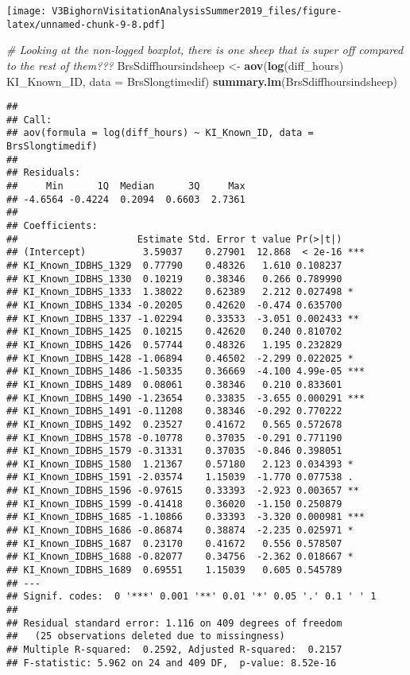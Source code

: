 \documentclass[]{article}
\newenvironment{Shaded}{\begin{snugshade}}{\end{snugshade}}
\newcommand{\CommentTok}[1]{\textcolor[rgb]{0.56,0.35,0.01}{\textit{#1}}}
\newcommand{\DataTypeTok}[1]{\textcolor[rgb]{0.13,0.29,0.53}{#1}}
\newcommand{\KeywordTok}[1]{\textcolor[rgb]{0.13,0.29,0.53}{\textbf{#1}}}
\newcommand{\NormalTok}[1]{#1}
\newcommand{\OperatorTok}[1]{\textcolor[rgb]{0.81,0.36,0.00}{\textbf{#1}}}
\newcommand{\StringTok}[1]{\textcolor[rgb]{0.31,0.60,0.02}{#1}}
\begin{document}
\texttt{[image: V3BighornVisitationAnalysisSummer2019\_files/figure-latex/unnamed-chunk-9-8.pdf]}

\begin{Shaded}
\begin{Highlighting}[]
\CommentTok{# Looking at the non-logged boxplot, there is one sheep that is super off compared to the rest of them???}
\NormalTok{BrsSdiffhoursindsheep <-}\StringTok{ }\KeywordTok{aov}\NormalTok{(}\KeywordTok{log}\NormalTok{(diff_hours) }\OperatorTok{~}\StringTok{ }\NormalTok{KI_Known_ID, }\DataTypeTok{data =}\NormalTok{ BrsSlongtimedif)}
\KeywordTok{summary.lm}\NormalTok{(BrsSdiffhoursindsheep)}
\end{Highlighting}
\end{Shaded}

\begin{verbatim}
## 
## Call:
## aov(formula = log(diff_hours) ~ KI_Known_ID, data = BrsSlongtimedif)
## 
## Residuals:
##     Min      1Q  Median      3Q     Max 
## -4.6564 -0.4224  0.2094  0.6603  2.7361 
## 
## Coefficients:
##                     Estimate Std. Error t value Pr(>|t|)    
## (Intercept)          3.59037    0.27901  12.868  < 2e-16 ***
## KI_Known_IDBHS_1329  0.77790    0.48326   1.610 0.108237    
## KI_Known_IDBHS_1330  0.10219    0.38346   0.266 0.789990    
## KI_Known_IDBHS_1333  1.38022    0.62389   2.212 0.027498 *  
## KI_Known_IDBHS_1334 -0.20205    0.42620  -0.474 0.635700    
## KI_Known_IDBHS_1337 -1.02294    0.33533  -3.051 0.002433 ** 
## KI_Known_IDBHS_1425  0.10215    0.42620   0.240 0.810702    
## KI_Known_IDBHS_1426  0.57744    0.48326   1.195 0.232829    
## KI_Known_IDBHS_1428 -1.06894    0.46502  -2.299 0.022025 *  
## KI_Known_IDBHS_1486 -1.50335    0.36669  -4.100 4.99e-05 ***
## KI_Known_IDBHS_1489  0.08061    0.38346   0.210 0.833601    
## KI_Known_IDBHS_1490 -1.23654    0.33835  -3.655 0.000291 ***
## KI_Known_IDBHS_1491 -0.11208    0.38346  -0.292 0.770222    
## KI_Known_IDBHS_1492  0.23527    0.41672   0.565 0.572678    
## KI_Known_IDBHS_1578 -0.10778    0.37035  -0.291 0.771190    
## KI_Known_IDBHS_1579 -0.31331    0.37035  -0.846 0.398051    
## KI_Known_IDBHS_1580  1.21367    0.57180   2.123 0.034393 *  
## KI_Known_IDBHS_1591 -2.03574    1.15039  -1.770 0.077538 .  
## KI_Known_IDBHS_1596 -0.97615    0.33393  -2.923 0.003657 ** 
## KI_Known_IDBHS_1599 -0.41418    0.36020  -1.150 0.250879    
## KI_Known_IDBHS_1685 -1.10866    0.33393  -3.320 0.000981 ***
## KI_Known_IDBHS_1686 -0.86874    0.38874  -2.235 0.025971 *  
## KI_Known_IDBHS_1687  0.23170    0.41672   0.556 0.578507    
## KI_Known_IDBHS_1688 -0.82077    0.34756  -2.362 0.018667 *  
## KI_Known_IDBHS_1689  0.69551    1.15039   0.605 0.545789    
## ---
## Signif. codes:  0 '***' 0.001 '**' 0.01 '*' 0.05 '.' 0.1 ' ' 1
## 
## Residual standard error: 1.116 on 409 degrees of freedom
##   (25 observations deleted due to missingness)
## Multiple R-squared:  0.2592, Adjusted R-squared:  0.2157 
## F-statistic: 5.962 on 24 and 409 DF,  p-value: 8.52e-16
\end{verbatim}
\end{document}

